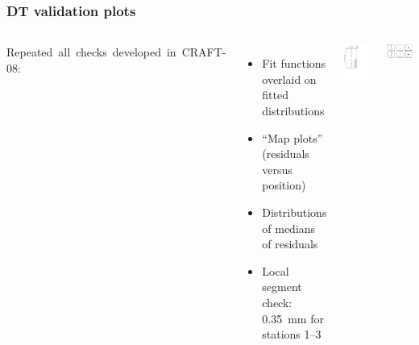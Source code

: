 \documentclass[compress]{beamer}
\begin{document}
\begin{frame}
\frametitle{DT validation plots}
\begin{columns}
\mbox{Repeated all checks developed in CRAFT-08:\hspace{-1 cm}}

\begin{itemize}
\item Fit functions overlaid on fitted distributions
\item ``Map plots'' (residuals versus position)
\item Distributions of medians of residuals
\item Local segment check: 0.35~mm for stations 1--3
\end{itemize}

\vfill
\includegraphics[height=\linewidth, angle=90]{NOV4_segdiff_x_whze.pdf}

\vspace{-1 cm}
\hfill \includegraphics[width=0.8\linewidth]{NOV4_fitfunctions/MBwhCst1sec10_bellcurves.png}


\end{columns}
\end{frame}
\end{document}
